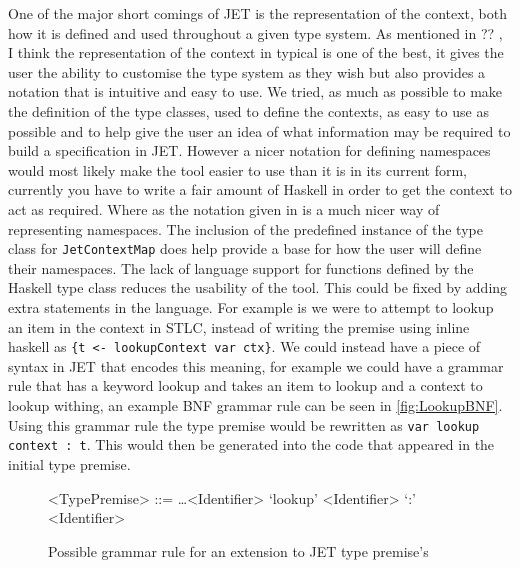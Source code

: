 One of the major short comings of JET is the representation of the context, both how it is defined and used throughout a given type system.
As mentioned in ?? , I think the representation of the context in typical is one of the best, it gives the user the ability to customise the type system as they wish but also provides a notation that is intuitive and easy to use.
We tried, as much as possible to make the definition of the type classes, used to define the contexts, as easy to use as possible and to help give the user an idea of what information may be required to build a specification in JET.
However a nicer notation for defining namespaces would most likely make the tool easier to use than it is in its current form, currently you have to write a fair amount of Haskell in order to get the context to act as required.
Where as the notation given in \textcite{grimm2007typical} is a much nicer way of representing namespaces.
The inclusion of the predefined instance of the type class for \texttt{JetContextMap} does help provide a base for how the user will define their namespaces.
The lack of language support for functions defined by the Haskell type class reduces the usability of the tool.
This could be fixed by adding extra statements in the language.
For example is we were to attempt to lookup an item in the context in STLC, instead of writing the premise using inline haskell as \texttt{\{t <- lookupContext var ctx\}}.
We could instead have a piece of syntax in JET that encodes this meaning, for example we could have a grammar rule that has a keyword lookup and takes an item to lookup and a context to lookup withing, an example BNF grammar rule can be seen in \autoref{fig:LookupBNF}.
Using this grammar rule the type premise would be rewritten as \texttt{var lookup context : t}.
This would then be generated into the code that appeared in the initial type premise.

\begin{figure}[]
    \centering
    \begin{grammar}
        <TypePremise> ::= \dots \alt <Identifier> `lookup' <Identifier> `:' <Identifier>
    \end{grammar}
    \caption{Possible grammar rule for an extension to JET type premise's}
    \label{fig:LookupBNF}
\end{figure}

